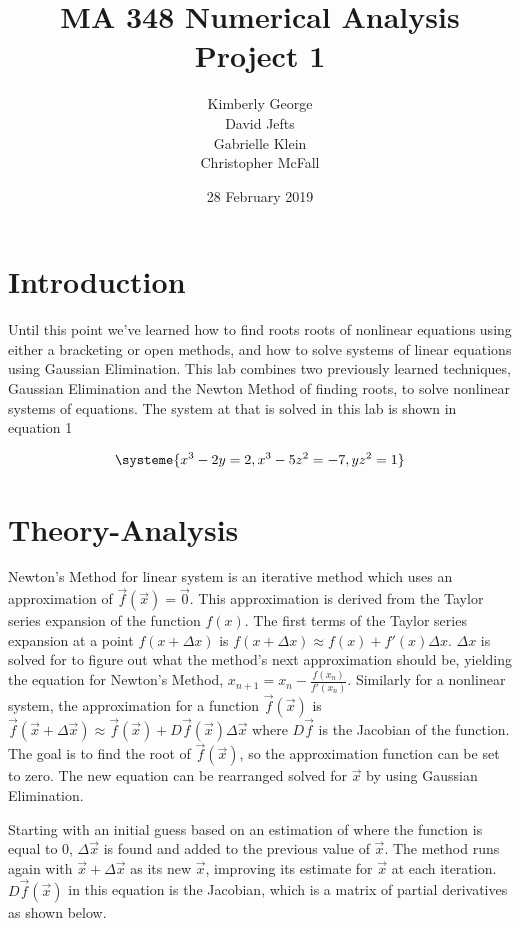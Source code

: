 \documentclass{article}
\title{MA 348 Numerical Analysis\\Project 1}
\author{Kimberly George\\David Jefts\\Gabrielle Klein\\Christopher McFall}
\date{28 February 2019}
\begin{document}
\begin{titlepage}
	\maketitle
\end{titlepage}


\section*{Introduction}

Until this point we've learned how to find roots roots of nonlinear equations using either a bracketing or open methods, and how to solve systems of linear equations using Gaussian Elimination. This lab combines two previously learned techniques, Gaussian Elimination and the Newton Method of finding roots, to solve nonlinear systems of equations. The system at that is solved in this lab is shown in equation 1

\begin{align}
\systeme{x^3 - 2y = 2,x^3 - 5z^2 = -7,yz^2 = 1}
\end{align}

\bigskip
\section*{Theory-Analysis}

Newton’s Method for linear system is an iterative method which uses an approximation of $\vec{f}(\vec{x})=\vec{0}$. This approximation is derived from the Taylor series expansion of the function $f(x)$. The first terms of the Taylor series expansion at a point $f(x+\Delta x)$ is $f(x+\Delta x) \approx f(x)+f'(x) \Delta x$. $\Delta x$ is solved for to figure out what the method’s next approximation should be, yielding the equation for Newton’s Method, $x_{n+1} = x_n - \frac{f(x_n)}{f'(x_n)}$. Similarly for a nonlinear system, the approximation for a function $\vec{f}(\vec{x})$ is $\vec{f}(\vec{x}+\Delta \vec{x}) \approx \vec{f}(\vec{x}) + D\vec{f}(\vec{x})\Delta \vec{x}$ where $D\vec{f}$ is the Jacobian of the function. The goal is to find the root of $\vec{f}(\vec{x})$, so the approximation function can be set to zero. The new equation can be rearranged solved for $\vec{x}$ by using Gaussian Elimination. \\\par

Starting with an initial guess based on an estimation of where the function is equal to 0, $\Delta \vec{x}$ is found and added to the previous value of $\vec{x}$. The method runs again with $\vec{x} + \Delta \vec{x}$ as its new $\vec{x}$, improving its estimate for $\vec{x}$ at each iteration. $D\vec{f}(\vec{x})$ in this equation is the Jacobian, which is a matrix of partial derivatives as shown below.
\end{document}

